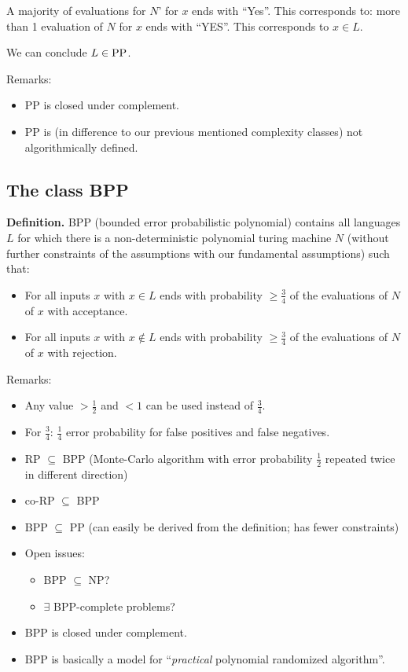 \documentclass[a4paper]{article}
\newcommand{\cls}[1]{\rm{#1}}
\begin{document}
A majority of evaluations for $N$' for $x$ ends with ``Yes''.
This corresponds to: more than 1 evaluation of $N$ for $x$ ends with ``YES''.
This corresponds to $x \in L$.

We can conclude $L \in \cls{PP}$.

Remarks:
\begin{itemize}
  \item \cls{PP} is closed under complement.
  \item \cls{PP} is (in difference to our previous mentioned complexity classes)
         not algorithmically defined.
\end{itemize}

\subsection{The class \cls{BPP}}
\label{class:bpp}
%
\textbf{Definition.} \cls{BPP} (bounded error probabilistic polynomial)
contains all languages $L$ for which there is a non-deterministic
polynomial turing machine $N$ (without further constraints of the
assumptions with our fundamental assumptions) such that:

\begin{itemize}
  \item For all inputs $x$ with $x \in L$ ends with probability $\geq \frac34$
         of the evaluations of $N$ of $x$ with acceptance.
  \item For all inputs $x$ with $x \notin L$ ends with probability $\geq \frac34$
         of the evaluations of $N$ of $x$ with rejection.
\end{itemize}

Remarks:
\begin{itemize}
  \item Any value $> \frac12$ and $<1$ can be used instead of $\frac34$.
  \item For $\frac34$: $\frac14$ error probability for false positives 
         and false negatives.
  \item \cls{RP} $\subseteq$ \cls{BPP} (Monte-Carlo algorithm with error probability
         $\frac12$ repeated twice in different direction)
  \item \cls{co-\cls{RP}} $\subseteq$ \cls{BPP}
  \item \cls{BPP} $\subseteq$ PP (can easily be derived from the definition;
         has fewer constraints)
  \item Open issues:
    \begin{itemize}
      \item \cls{BPP} $\subseteq$ \cls{NP}?
      \item $\exists$ \cls{BPP}-complete problems?
    \end{itemize}
  \item \cls{BPP} is closed under complement.
  \item \cls{BPP} is basically a model for ``\emph{practical} polynomial randomized algorithm''.
\end{itemize}
\end{document}
